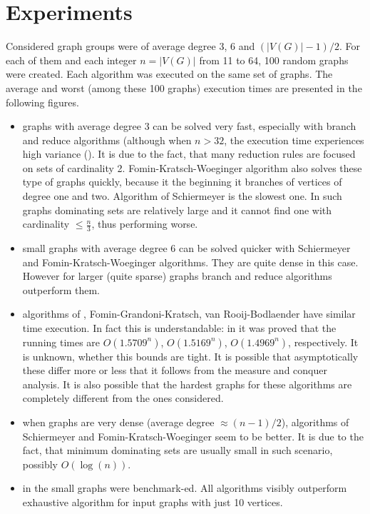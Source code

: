 \section{Experiments}
Considered graph groups were of average degree 3, 6 and $(|V(G)|-1)/2$. For each of them and each integer $n = |V(G)|$ from 11 to 64, 100 random graphs were created. Each algorithm was executed on the same set of graphs. The average and worst (among these 100 graphs) execution times are presented in the following figures.
\begin{itemize}
    \item graphs with average degree 3 can be solved very fast, especially with branch and reduce algorithms (although when $n > 32$, the execution time experiences high variance (). It is due to the fact, that many reduction rules are focused on sets of cardinality 2. Fomin-Kratsch-Woeginger algorithm also solves these type of graphs quickly, because it the beginning it branches of vertices of degree one and two. Algorithm of Schiermeyer is the slowest one. In such graphs dominating sets are relatively large and it cannot find one with cardinality $\leq \frac{n}{3}$, thus performing worse.
    \item small graphs with average degree 6 can be solved quicker with Schiermeyer and Fomin-Kratsch-Woeginger algorithms. They are quite dense in this case. However for larger (quite sparse) graphs branch and reduce algorithms outperform them.
    \item algorithms of \citeauthor{GRANDONI2006209}, Fomin-Grandoni-Kratsch, van Rooij-Bodlaender have similar time execution. In fact this is understandable: in \cite{VANROOIJ20112147} it was proved that the running times are $O(1.5709^n)$, $O(1.5169^n)$, $O(1.4969^n)$, respectively. It is unknown, whether this bounds are tight. It is possible that asymptotically these differ more or less that it follows from the measure and conquer analysis. It is also possible that the hardest graphs for these algorithms are completely different from the ones considered. 
    \item when graphs are very dense (average degree $\approx(n-1)/2$), algorithms of Schiermeyer and Fomin-Kratsch-Woeginger seem to be better. It is due to the fact, that minimum dominating sets are usually small in such scenario, possibly $O(\log(n))$.
    \item in the  small graphs were benchmark-ed. All algorithms visibly outperform exhaustive algorithm for input graphs with just 10 vertices. 
\end{itemize}

